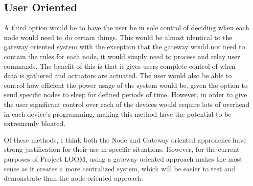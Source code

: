\documentclass[onecolumn, draftclsnofoot,10pt, compsoc]{IEEEtran}
\begin{document}
	\subsection{User Oriented}
	A third option would be to have the user be in sole control of deciding when each node would need to 
	do certain things. This would be almost identical to the gateway oriented system with the exception that
	the gateway would not need to contain the rules for each node, it would simply need to process and relay
	user commands. The benefit of this is that it gives users complete control of when data is gathered and 
	actuators are actuated. The user would also be able to control how efficient the power usage of the 
	system would be, given the option to send specific nodes to sleep for defined periods of time. However, in order
	to give the user significant control over each of the devices would require lots of overhead in each
	device's programming, making this method have the potential to be extrememly bloated. 
	
Of these methods, I think both the Node and Gateway oriented approaches have strong justification for their use
in specific situations. However, for the current purposes of Project LOOM, using a gateway oriented approach makes
the most sense as it creates a more centralized system, which will be easier to test and demonstrate than the 
node oriented approach. 

{}

\end{document}

